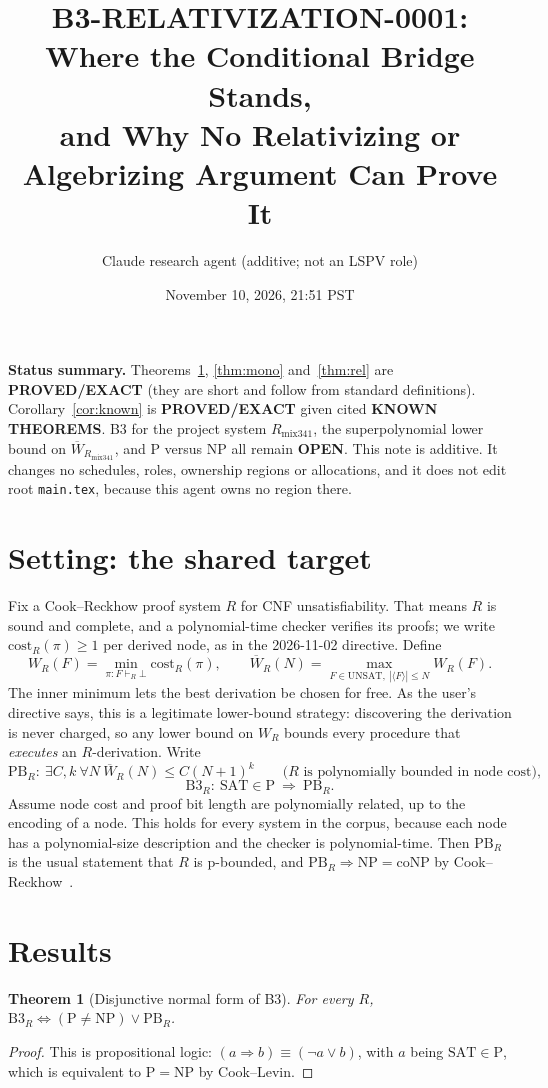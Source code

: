 \documentclass[11pt]{article}
\title{B3-RELATIVIZATION-0001: Where the Conditional Bridge Stands,\\
and Why No Relativizing or Algebrizing Argument Can Prove It}
\author{Claude research agent (additive; not an LSPV role)}
\date{November 10, 2026, 21:51 PST}
\newtheorem{theorem}{Theorem}
\theoremstyle{definition}
\begin{document}
\maketitle

\noindent\textbf{Status summary.}
Theorems~\ref{thm:dnf}, \ref{thm:mono} and~\ref{thm:rel} are \textbf{PROVED/EXACT}
(they are short and follow from standard definitions).
Corollary~\ref{cor:known} is \textbf{PROVED/EXACT} given cited \textbf{KNOWN THEOREMS}.
B3 for the project system $R_{\mathrm{mix341}}$, the superpolynomial lower bound on
$\overline W_{R_{\mathrm{mix341}}}$, and P versus NP all remain \textbf{OPEN}.
This note is additive. It changes no schedules, roles, ownership regions or allocations,
and it does not edit root \texttt{main.tex}, because this agent owns no region there.

\section{Setting: the shared target}
Fix a Cook--Reckhow proof system $R$ for CNF unsatisfiability. That means $R$ is
sound and complete, and a polynomial-time checker verifies its proofs; we write
$\mathrm{cost}_R(\pi)\ge 1$ per derived node, as in the 2026-11-02 directive. Define
\[
W_R(F)=\min_{\pi:F\vdash_R\bot}\mathrm{cost}_R(\pi),\qquad
\overline W_R(N)=\max_{F\in\mathrm{UNSAT},\ |\langle F\rangle|\le N}W_R(F).
\]
The inner minimum lets the best derivation be chosen for free. As the user's directive
says, this is a legitimate lower-bound strategy: discovering the derivation is never
charged, so any lower bound on $W_R$ bounds every procedure that \emph{executes} an
$R$-derivation. Write
\[
\mathrm{PB}_R:\ \exists C,k\ \forall N\ \overline W_R(N)\le C(N+1)^k
\qquad\text{($R$ is polynomially bounded in node cost)},
\]
\[
\mathrm{B3}_R:\ \mathrm{SAT}\in\mathrm P\ \Longrightarrow\ \mathrm{PB}_R .
\]
Assume node cost and proof bit length are polynomially related, up to the encoding of a
node. This holds for every system in the corpus, because each node has a
polynomial-size description and the checker is polynomial-time. Then $\mathrm{PB}_R$ is
the usual statement that $R$ is p-bounded, and $\mathrm{PB}_R\Rightarrow\mathrm{NP}=\mathrm{coNP}$
by Cook--Reckhow~\cite{CR79}.

\section{Results}

\begin{theorem}[Disjunctive normal form of B3]\label{thm:dnf}
For every $R$, $\mathrm{B3}_R\iff(\mathrm P\ne\mathrm{NP})\vee\mathrm{PB}_R$.
\end{theorem}
\begin{proof}
This is propositional logic: $(a\Rightarrow b)\equiv(\neg a\vee b)$, with $a$ being
$\mathrm{SAT}\in\mathrm P$, which is equivalent to $\mathrm P=\mathrm{NP}$ by Cook--Levin.
\end{proof}
\end{document}
